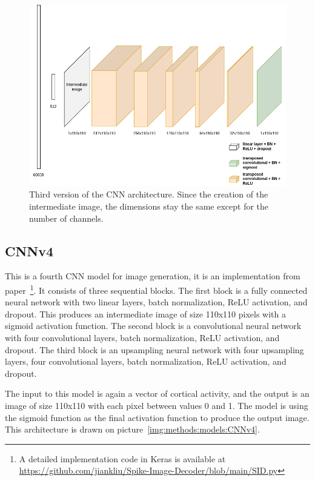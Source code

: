 \begin{figure}[H]\centering
\includegraphics[width=140mm]{img/cnnv3.drawio.png}
\caption{Third version of the CNN architecture. Since the creation of the intermediate image, the dimensions stay the same except for the number of channels.}
\label{img:methods:models:CNNv3}
\end{figure}


\subsection{CNNv4}
\label{methods:models:CNNv4}
This is a fourth CNN model for image generation, it is an implementation from paper~\citep{zhang2020reconstruction}\footnote{A detailed implementation code in Keras is available at \url{https://github.com/jiankliu/Spike-Image-Decoder/blob/main/SID.py}}. It consists of three sequential blocks. The first block is a fully connected neural network with two linear layers, batch normalization, ReLU activation, and dropout. This produces an intermediate image of size 110x110 pixels with a sigmoid activation function. The second block is a convolutional neural network with four convolutional layers, batch normalization, ReLU activation, and dropout. The third block is an upsampling neural network with four upsampling layers, four convolutional layers, batch normalization, ReLU activation, and dropout.

The input to this model is again a vector of cortical activity, and the output is an image of size 110x110 with each pixel between values 0 and 1. The model is using the sigmoid function as the final activation function to produce the output image. This architecture is drawn on picture~\ref{img:methods:models:CNNv4}.

